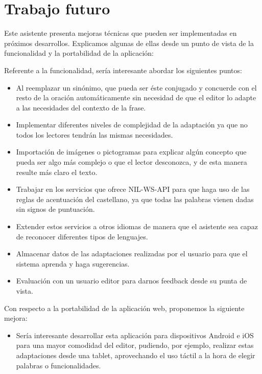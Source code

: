 \section{Trabajo futuro}
Este asistente presenta mejoras técnicas que pueden ser implementadas en próximos desarrollos. Explicamos algunas de ellas desde un punto de vista de la funcionalidad y la portabilidad de la aplicación:

Referente a la funcionalidad, sería interesante abordar los siguientes puntos:

\begin{itemize}
	\item	Al reemplazar un sinónimo, que pueda ser éste conjugado y concuerde con el resto de la oración automáticamente sin necesidad de que el editor lo adapte a las necesidades del contexto de la frase.
		\item	Implementar diferentes niveles de complejidad de la adaptación ya que no todos los lectores tendrán las mismas necesidades.
	\item Importación de imágenes o pictogramas para explicar algún concepto que pueda ser algo más complejo o que el lector desconozca, y de esta manera resulte más claro el texto.
	\item	Trabajar en los servicios que ofrece NIL-WS-API para que haga uso de las reglas de acentuación del castellano, ya que todas las palabras vienen dadas sin signos de puntuación.
	\item	Extender estos servicios a otros idiomas de manera que el asistente sea capaz de reconocer diferentes tipos de lenguajes.
	
	\item  Almacenar datos de las adaptaciones realizadas por el usuario para que el sistema aprenda y haga sugerencias.
	\item Evaluación con un usuario editor para darnos feedback desde su punta de vista.
\end{itemize}	
Con respecto a la portabilidad de la aplicación web, proponemos la siguiente mejora:
\begin{itemize}
	\item	Sería interesante desarrollar esta aplicación para dispositivos Android e iOS para una mayor comodidad del editor, pudiendo, por ejemplo, realizar estas adaptaciones desde una tablet, aprovechando el uso táctil a la hora de elegir palabras o funcionalidades.

\end{itemize}

